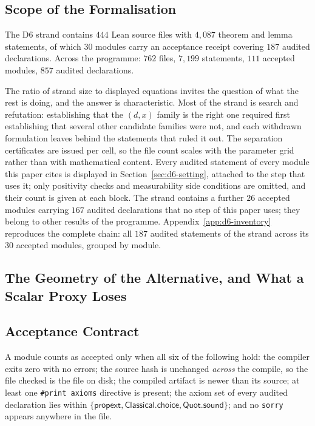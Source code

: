 \subsection{Scope of the Formalisation}

The D6 strand contains $444$ Lean source files with $4{,}087$ theorem and lemma statements,
of which $30$ modules carry an acceptance receipt covering $187$ audited declarations. Across
the programme: $762$ files, $7{,}199$ statements, $111$ accepted modules, $857$ audited
declarations.

The ratio of strand size to displayed equations invites the question of what the rest is doing,
and the answer is characteristic. Most of the strand is search and refutation: establishing
that the $(d,x)$ family is the right one required first establishing that several other
candidate families were not, and each withdrawn formulation leaves behind the statements that
ruled it out. The separation certificates are issued per cell, so the file count scales with
the parameter grid rather than with mathematical content.
Every audited statement of every module this paper cites is displayed in Section~\ref{sec:d6-setting}, attached to the step that uses it; only positivity checks and measurability side conditions are omitted, and their count is given at each block. The strand contains a further $26$ accepted modules carrying $167$ audited declarations that no step of this paper uses; they belong to other results of the programme. Appendix~\ref{app:d6-inventory} reproduces the complete chain: all $187$ audited statements of the strand across its $30$ accepted modules, grouped by module.


\subsection{The Geometry of the Alternative, and What a Scalar Proxy Loses}
\label{sec:fn-verification}

\subsection{Acceptance Contract}

A module counts as accepted only when all six of the following hold: the compiler exits zero
with no errors; the source hash is unchanged \emph{across} the compile, so the file checked is
the file on disk; the compiled artifact is newer than its source; at least one
\texttt{\#print axioms} directive is present; the axiom set of every audited declaration lies
within $\{\textsf{propext},\textsf{Classical.choice},\textsf{Quot.sound}\}$; and no
\texttt{sorry} appears anywhere in the file.


